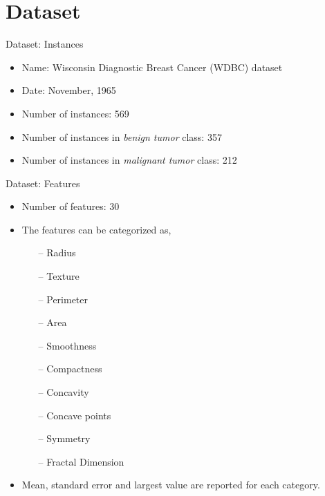 \documentclass[xcolor=dvipsnames]{beamer}
\newcommand{\spread}{\setlength{\itemsep}{\fill}}
\begin{document}
\section{Dataset}
\begin{frame}{Dataset: Instances}
\begin{itemize}
\spread
\item Name: Wisconsin Diagnostic Breast Cancer (WDBC) dataset
\item Date: November, 1965
\item Number of instances: 569
\item Number of instances in \textit{benign tumor} class: 357
\item Number of instances in \textit{malignant tumor} class: 212
\end{itemize}
\end{frame}

\begin{frame}{Dataset: Features}
\begin{itemize}
\spread
\item Number of features: 30
\item The features can be categorized as,
\begin{itemize}
\item[--] Radius
\item[--] Texture
\item[--] Perimeter
\item[--] Area
\item[--] Smoothness
\item[--] Compactness
\item[--] Concavity
\item[--] Concave points
\item[--] Symmetry
\item[--] Fractal Dimension
\end{itemize}
\item Mean, standard error and largest value are reported for each category.
\end{itemize}
\end{frame}
\end{document}
